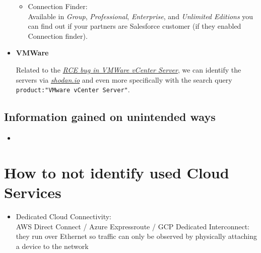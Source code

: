 \documentclass[12pt]{article}
\begin{document}
\begin{itemize}
\begin{itemize}
        \item Connection Finder: \\
        Available in \textit{Group}, \textit{Professional}, \textit{Enterprise}, and \textit{Unlimited Editions} you can find out if your partners are Salesforce customer (if they enabled Connection finder).
    \end{itemize}
    
    
    \item \textbf{VMWare}
    
    Related to the \href{https://thehackernews.com/2021/06/alert-critical-rce-bug-in-vmware.html?m=1}{\textit{RCE bug in VMWare vCenter Server}}, we can identify the servers via \href{https://www.shodan.io/search?query=vCenter+Server}{\textit{shodan.io}} and even more specifically with the search query \\ \verb|product:"VMware vCenter Server"|.
    

 
\end{itemize}

\subsection*{Information gained on unintended ways}
\begin{itemize}
    \item 
\end{itemize}


\newpage
\section*{How to not identify used Cloud Services}
\begin{itemize}
    \item Dedicated Cloud Connectivity: \\ AWS Direct Connect / Azure Expressroute / GCP Dedicated Interconnect: they run over Ethernet so traffic can only be observed by physically attaching a device to the network
\end{itemize}
\end{document}
